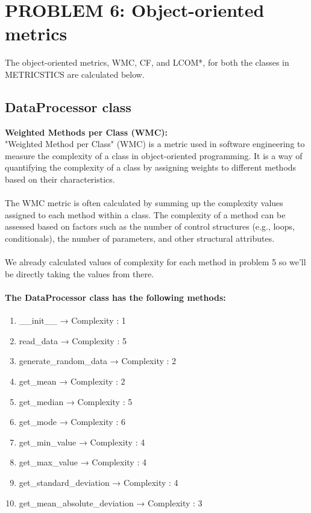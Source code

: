 \documentclass[runningheads]{llncs}
\begin{document}
\section{PROBLEM 6: Object-oriented metrics}
The object-oriented metrics, WMC, CF, and LCOM*, for both the classes in METRICSTICS are calculated below.
\subsection{DataProcessor class}
\textbf{Weighted Methods per Class (WMC):}\\
"Weighted Method per Class" (WMC) is a metric used in software engineering to measure the complexity of a class in object-oriented programming. It is a way of quantifying the complexity of a class by assigning weights to different methods based on their characteristics.
\\ \\
The WMC metric is often calculated by summing up the complexity values assigned to each method within a class. The complexity of a method can be assessed based on factors such as the number of control structures (e.g., loops, conditionals), the number of parameters, and other structural attributes.
\\ \\
We already calculated values of complexity for each method in problem 5 so we’ll be directly taking the values from there.

\paragraph{The DataProcessor class has the following methods:}

\begin{enumerate}
    \item \_\_init\_\_ → Complexity : 1
    \item read\_data → Complexity : 5
    \item generate\_random\_data → Complexity : 2
    \item get\_mean → Complexity : 2
    \item get\_median → Complexity : 5
    \item get\_mode → Complexity : 6
    \item get\_min\_value → Complexity : 4
    \item get\_max\_value → Complexity : 4
    \item get\_standard\_deviation → Complexity : 4
    \item get\_mean\_absolute\_deviation → Complexity : 3
\end{enumerate}
\end{document}
